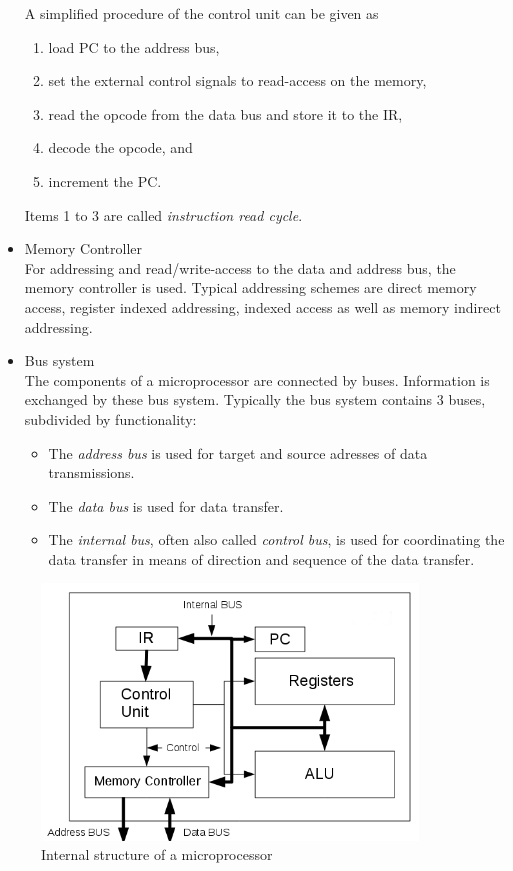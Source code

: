 \begin{itemize}
A simplified procedure of the control unit can be given as
\begin{enumerate}
\item load PC to the address bus,
\item set the external control signals to read-access on the memory,
\item read the opcode from the data bus and store it to the IR,
\item decode the opcode, and
\item increment the PC.
\end{enumerate}
Items 1 to 3 are called \textit{instruction read cycle}.
\item Memory Controller\\
For addressing and read/write-access to the data and address bus, the memory controller is used. Typical addressing schemes are direct memory access, register indexed addressing, indexed access as well as memory indirect addressing.
\item Bus system\\
The components of a microprocessor are connected by buses. Information is exchanged by these bus system. Typically the bus system contains 3 buses, subdivided by functionality:\cite{Bei04}
\begin{itemize}
\item The \textit{address bus} is used for target and source adresses of data transmissions.
\item The \textit{data bus} is used for data transfer.
\item The \textit{internal bus}, often also called \textit{control bus}, is used for coordinating the data transfer in means of direction and sequence of the data transfer.
\end{itemize}
\end{itemize}
\begin{figure}[htbp]
\begin{center}
\includegraphics[width=10cm,keepaspectratio=true]{bilder/png/microprocessorblockdiagram}
\caption{Internal structure of a microprocessor}
\label{fig:microprocessorblockdiagram}
\end{center}
\end{figure}

